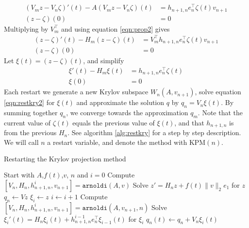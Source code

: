 \begin{equation*}%
\begin{aligned}
 (V_m z-V_n \zeta)'(t)-A (V_m z-V_n \zeta)(t) &=  h_{n+1,n}e_n^\top \zeta(t) v_{n+1}  \\
(z-\zeta)(0)& = 0
\end{aligned}
\end{equation*}
Multiplying by $V_m^{\top}$ and using equation \eqref{eqn:prop2} gives
\begin{equation*}
\begin{aligned}
 (z-\zeta)'(t)-H_m (z-\zeta)(t) &= V_m^\top h_{n+1,n}e_n^\top \zeta(t) v_{n+1}  \\
(z-\zeta)(0)& = 0
\end{aligned}
\end{equation*}
Let $\xi(t) = (z-\zeta)(t)$, and simplify
\begin{equation}\label{eqn:restkry2}
\begin{aligned}
 \xi '(t) -H_m \xi(t) &= h_{n+1,n}e_n^\top \zeta (t)  \\
\xi(0)& = 0
\end{aligned}
\end{equation}
Each restart we generate a new Krylov subspace $W_n(A,v_{n+1})$, solve equation \eqref{eqn:restkry2} for $\xi(t)$ and approximate the solution $q$ by $ q_n =  V_n\xi(t)$. By summing together $q_n$, we converge towards the approximation $q_m$. Note that the current value of $\zeta(t)$ equals the previous value of $\xi(t)$, and that $h_{n+1,n}$ is from the previous $H_n$. See algorithm \ref{alg:restkry} for a step by step description. We will call $n$ a restart variable, and denote the method with KPM$(n)$.
\begin{algorithm}
\begin{algorithmic} \caption{Restarting the Krylov projection method} \label{alg:restkry} 
\STATE Start with $A$,$f(t)$,$v$, $n$ and $i = 0$
\STATE Compute $[V_n,H_n,h_{n+1,n}^i,v_{n+1}] = \texttt{arnoldi}(A,v)$
\STATE Solve $  z' = H_n z + f(t) \| v \|_2 e_1  $ for $z$
\STATE $ q_n \leftarrow  V z $
\STATE $\xi_i \leftarrow z$
    \STATE $i \leftarrow i + 1$
    \STATE Compute $[V_n,H_n,h_{n+1,n}^i,v_{n+1}] = \texttt{arnoldi}(A,v_{n+1},n)$
    \STATE Solve $ \xi_i'(t) = H_n \xi_i(t) + h_{n+1,n}^{i-1}e_n^\top \xi_{i-1}(t)  $ for $\xi_i$
    \STATE $ q_n(t) \leftarrow q_n + V_n \xi_i(t) $
\ENDWHILE
\end{algorithmic} 
\end{algorithm}

